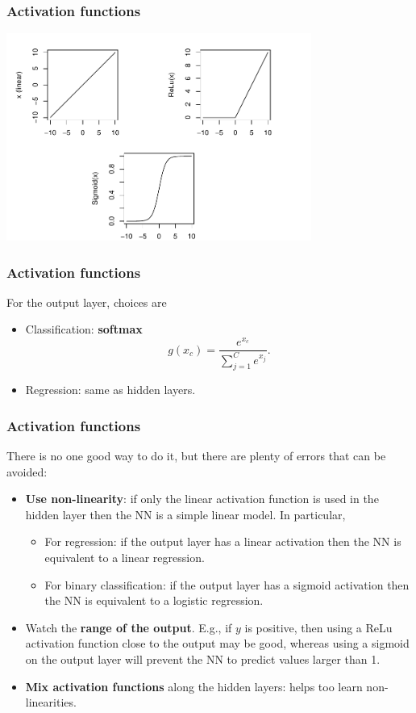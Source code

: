 \begin{frame}
\frametitle{Activation functions}
\begin{center}
\includegraphics[width=10cm]{../../Graphs/Activation_graphs.pdf}
\end{center}
\end{frame}
\begin{frame}
\frametitle{Activation functions}
For the output layer, choices are
\begin{itemize}
\item Classification: {\bf softmax}
$$
g(x_c) = \frac{e^{x_c}}{\sum_{j=1}^C e^{x_j}}.
$$
\item Regression: same as hidden layers.
\end{itemize}
\end{frame}
\begin{frame}
\frametitle{Activation functions}
There is no one good way to do it, but there are plenty of errors that can be avoided:
\begin{itemize}
\item {\bf Use non-linearity}: if only the linear activation function is used in the hidden layer then the NN is a simple linear model. In particular,
\begin{itemize}
\item For regression: if the output layer has a linear activation then the NN is equivalent to a linear regression.
\item For binary classification: if the output layer has a sigmoid activation then the NN is equivalent to a logistic regression.
\end{itemize}
\item Watch the {\bf range of the output}. E.g., if $y$ is positive, then using a ReLu activation function close to the output may be good, whereas using a sigmoid on the output layer will prevent the NN to predict values larger than 1.
\item {\bf Mix activation functions} along the hidden layers: helps too learn non-linearities.
\end{itemize}
\end{frame}
